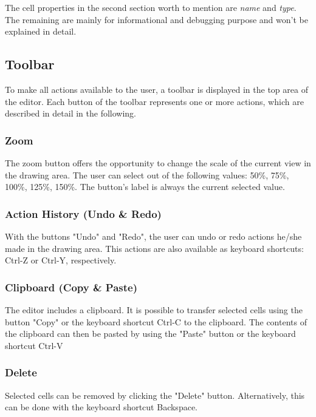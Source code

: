 \documentclass[a4paper,top=25mm,bottom=25mm,12pt,pdftex,halfparskip,twoside,bibtotoc,numbers=noenddot]{scrbook}
\begin{document}
The cell properties in the second section worth to mention are \textit{name} and \textit{type}. The remaining are mainly for informational and debugging purpose and won't be explained in detail.

\subsection{Toolbar}

To make all actions available to the user, a toolbar is displayed in the top area of the editor. Each button of the toolbar represents one or more actions, which are described in detail in the following.

\subsubsection{Zoom}

The zoom button offers the opportunity to change the scale of the current view in the drawing area. The user can select out of the following values: 50\%, 75\%, 100\%, 125\%, 150\%. The button's label is always the current selected value.

\subsubsection{Action History (Undo \& Redo)}

With the buttons "Undo" and "Redo", the user can undo or redo actions he/she made in the drawing area. This actions are also available as keyboard shortcuts: \textsf{Ctrl-Z} or \textsf{Ctrl-Y}, respectively.

\subsubsection{Clipboard (Copy \& Paste)}

The editor includes a clipboard. It is possible to transfer selected cells using the button "Copy" or the keyboard shortcut \textsf{Ctrl-C} to the clipboard.
The contents of the clipboard can then be pasted by using the "Paste" button or the keyboard shortcut \textsf{Ctrl-V}

\subsubsection{Delete}

Selected cells can be removed by clicking the "Delete" button. Alternatively, this can be done with the keyboard shortcut \textsf{Backspace}.
\end{document}
